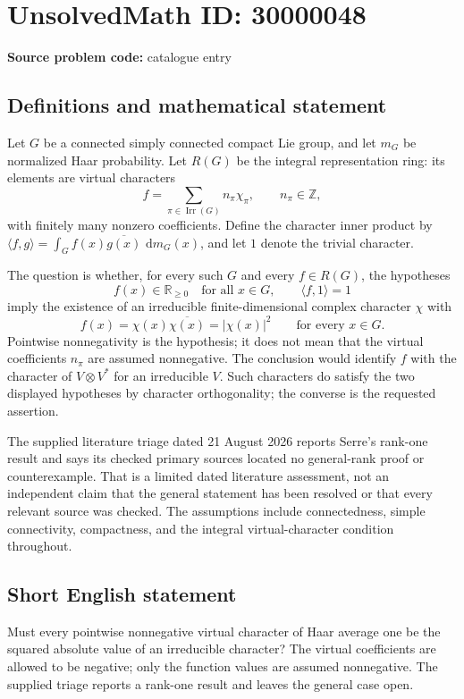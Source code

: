 \documentclass[11pt]{article}
\newcommand{\Z}{\mathbb{Z}}
\newcommand{\R}{\mathbb{R}}
\newcommand{\dd}{\,\mathrm{d}}
\begin{document}
\section*{UnsolvedMath ID: 30000048}
\textbf{Source problem code:} catalogue entry
\subsection{Definitions and mathematical statement}
Let \(G\) be a connected simply connected compact Lie group, and let \(m_G\) be normalized Haar probability. Let \(R(G)\) be the integral representation ring: its elements are virtual characters
\[
 f=\sum_{\pi\in\operatorname{Irr}(G)}n_\pi\chi_\pi,
 \qquad n_\pi\in\Z,
\]
with finitely many nonzero coefficients. Define the character inner product by \(\langle f,g\rangle=\int_G f(x)\overline{g(x)}\,\dd m_G(x)\), and let \(1\) denote the trivial character.

The question is whether, for every such \(G\) and every \(f\in R(G)\), the hypotheses
\[
 f(x)\in\R_{\geq0}\quad\text{for all }x\in G,
 \qquad\langle f,1\rangle=1
\]
imply the existence of an irreducible finite-dimensional complex character \(\chi\) with
\[
 f(x)=\chi(x)\overline{\chi(x)}=|\chi(x)|^2
 \qquad\text{for every }x\in G.
\]
Pointwise nonnegativity is the hypothesis; it does not mean that the virtual coefficients \(n_\pi\) are assumed nonnegative. The conclusion would identify \(f\) with the character of \(V\otimes V^*\) for an irreducible \(V\). Such characters do satisfy the two displayed hypotheses by character orthogonality; the converse is the requested assertion.

The supplied literature triage dated 21 August 2026 reports Serre's rank-one result and says its checked primary sources located no general-rank proof or counterexample. That is a limited dated literature assessment, not an independent claim that the general statement has been resolved or that every relevant source was checked. The assumptions include connectedness, simple connectivity, compactness, and the integral virtual-character condition throughout.
\subsection{Short English statement}
Must every pointwise nonnegative virtual character of Haar average one be the squared absolute value of an irreducible character? The virtual coefficients are allowed to be negative; only the function values are assumed nonnegative. The supplied triage reports a rank-one result and leaves the general case open.
\end{document}
